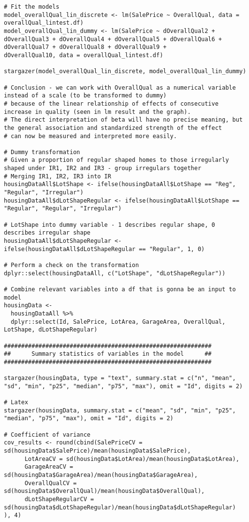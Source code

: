 \documentclass{article}
\begin{document}
\begin{tiny}
\begin{verbatim}
# Fit the models
model_overallQual_lin_discrete <- lm(SalePrice ~ OverallQual, data = overallQual_lintest.df)
model_overallQual_lin_dummy <- lm(SalePrice ~ dOverallQual2 + dOverallQual3 + dOverallQual4 + dOverallQual5 + dOverallQual6 + dOverallQual7 + dOverallQual8 + dOverallQual9 + 
dOverallQual10, data = overallQual_lintest.df)

stargazer(model_overallQual_lin_discrete, model_overallQual_lin_dummy)

# Conclusion - we can work with OverallQual as a numerical variable instead of a scale (to be transformed to dummy) 
# because of the linear relationship of effects of consecutive increase in quality (seen in lm result and the graph). 
# The direct interpretation of beta will have no precise meaning, but the general association and standardized strength of the effect 
# can now be measured and interpreted more easily. 

# Dummy transformation
# Given a proportion of regular shaped homes to those irregularly shaped under IR1, IR2 and IR3 - group irregulars together
# Merging IR1, IR2, IR3 into IR
housingDataAll$LotShape <- ifelse(housingDataAll$LotShape == "Reg", "Regular", "Irregular")
housingDataAll$dLotShapeRegular <- ifelse(housingDataAll$LotShape == "Regular", "Regular", "Irregular")

# LotShape into dummy variable - 1 describes regular shape, 0 describes irregular shape
housingDataAll$dLotShapeRegular <- ifelse(housingDataAll$dLotShapeRegular == "Regular", 1, 0)

# Perform a check on the transformation
dplyr::select(housingDataAll, c("LotShape", "dLotShapeRegular"))

# Combine relevant variables into a df that is gonna be an input to model 
housingData <- 
  housingDataAll %>% 
  dplyr::select(Id, SalePrice, LotArea, GarageArea, OverallQual, LotShape, dLotShapeRegular)

############################################################
##      Summary statistics of variables in the model      ##
############################################################

stargazer(housingData, type = "text", summary.stat = c("n", "mean", "sd", "min", "p25", "median", "p75", "max"), omit = "Id", digits = 2)

# Latex
stargazer(housingData, summary.stat = c("mean", "sd", "min", "p25", "median", "p75", "max"), omit = "Id", digits = 2)

# Coefficient of variance
cov_results <- round(cbind(SalePriceCV = sd(housingData$SalePrice)/mean(housingData$SalePrice),
      LotAreaCV = sd(housingData$LotArea)/mean(housingData$LotArea),
      GarageAreaCV = sd(housingData$GarageArea)/mean(housingData$GarageArea),
      OverallQualCV = sd(housingData$OverallQual)/mean(housingData$OverallQual),
      dLotShapeRegularCV = sd(housingData$dLotShapeRegular)/mean(housingData$dLotShapeRegular)
), 4)


\end{verbatim}
\end{tiny}
\end{document}
